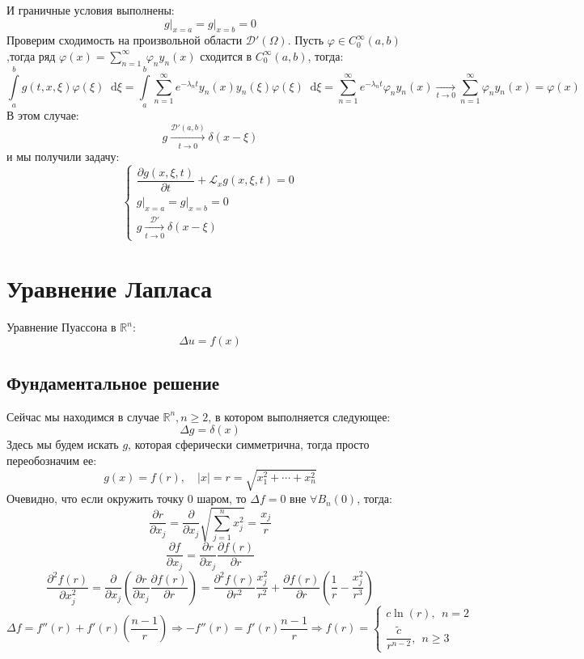 \documentclass[11pt,a4paper]{report}
\numberwithin{equation}{section}
\numberwithin{figure}{chapter}
\numberwithin{table}{chapter}
\newcommand{\R}{\mathbb{R}}
\newcommand{\D}{\mathcal{D}}
\newcommand{\LL}{\mathscr{L}}
\newcommand{\p}{\partial}
\newcommand{\dd}{\mathop{}\!\mathrm{d}}
\newcommand{\skobka}[1]{\left( #1 \right)}
\newcommand{\SUMN}{\sum\limits_{n=1}^{\infty}}
\renewcommand{\phi}{\varphi}
\begin{document}
И граничные условия выполнены:
\[
g\Big|_{x = a} = g\Big|_{x = b} = 0
\]
Проверим сходимость на произвольной области $\D'(\Omega)$. Пусть $\phi\in C^{\infty}_0(a,b)$,тогда ряд $\phi(x) = \SUMN\ \phi_ny_n(x)$ сходится в $C^{\infty}_0(a,b)$, тогда:
\[\int\limits_{a}^bg(t,x,\xi)\phi(\xi)\dd \xi = \int\limits_a^b\SUMN e^{-\lambda_n t}y_n(x)y_n(\xi)\phi(\xi)\dd \xi = \SUMN e^{-\lambda_nt}\phi_ny_n(x)\xrightarrow[t\to0]{}\SUMN \phi_ny_n(x) = \phi(x)\]
В этом случае:
\[g\xrightarrow[t\to0]{\D'(a,b)}\delta(x-\xi)\] и мы получили задачу:
\[\begin{cases}
    \dfrac{\p g(x,\xi,t)}{\p t} + \LL_x g(x,\xi,t) = 0\\
    g\Big|_{x=a} = g\Big|_{x=b} = 0\\
    g\xrightarrow[t\to0]{\D'}\delta(x-\xi)
\end{cases}\]
\section{Уравнение Лапласа}
Уравнение Пуассона в $\R^n$:
\[
\Delta u = f(x)
\]
\subsection{Фундаментальное решение}
Сейчас мы находимся в случае $\R^n, n\geq 2$, в котором выполняется следующее:
\[\Delta g =\delta (x)\]
Здесь мы будем искать $g$, которая сферически симметрична, тогда просто переобозначим ее:
\[g(x)=f(r), \quad |x|=r=\sqrt{x^2_1+\cdots +x^2_n}\]
Очевидно, что если окружить точку 0 шаром, то $\Delta f = 0$ вне $\forall B_n(0)$, тогда:
\[\dfrac{\p r}{\p x_j}=\dfrac{\p}{\p x_j}\sqrt{\sum\limits_{j=1}^{n}x^2_j}=\dfrac{x_j}{r}\]
\[\dfrac{\p f}{\p x_j}=\dfrac{\p r}{\p x_j}\dfrac{\p f(r)}{\p r}\]
\[\dfrac{\p^2 f(r)}{\p x_j^2}=\dfrac{\p}{\p x_j}\skobka{\dfrac{\p r}{\p x_j}\dfrac{\p f(r)}{\p r}}=\dfrac{\p^2 f(r)}{\p r^2}\dfrac{x^2_j}{r^2}+\dfrac{\p f(r)}{\p r}\skobka{\dfrac{1}{r}-\dfrac{x^2_j}{r^3}}\]
\[\Delta f = f''(r)+f'(r)\left(\dfrac{n-1}{r}\right)\Rightarrow -f''(r)=f'(r)\dfrac{n-1}{r}\Rightarrow f(r)=\begin{cases}
    c\ln(r), \ \ n=2\\
    \dfrac{\tilde{c}}{r^{n-2}}, \ \ n\geq 3
\end{cases}\]
\end{document}
